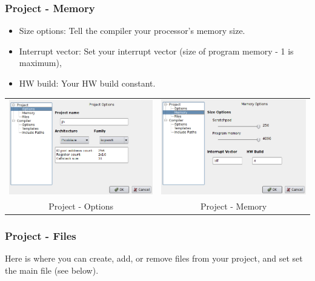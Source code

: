         \subsubsection{Project - Memory}
            \begin{itemize}
                \item Size options: Tell the compiler your processor's memory size.
                \item Interrupt vector: Set your interrupt vector (size of program memory - 1 is maximum),
                \item HW build: Your HW build constant.
            \end{itemize}
            \begin{table}[h!]
                \begin{tabular}{cc}
                    \includegraphics[width=.5\textwidth]{img/config2.png}
                        &
                    \includegraphics[width=.5\textwidth]{img/config1.png}
                        \\
                    Project - Options & Project - Memory
                \end{tabular}
            \end{table}

        \subsubsection{Project - Files}
            Here is where you can create, add, or remove files from your project, and set set the main file (see below).

